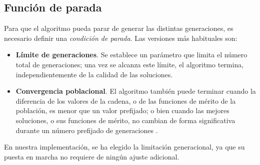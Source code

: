 \documentclass[12pt,a4paper]{book}
\begin{document}
\subsection{Función de parada}
Para que el algoritmo pueda parar de generar las distintas generaciones, es necesario definir una \textsl{condición de parada}. Las versiones más habituales son: 

\begin{itemize}
	\item \textbf{Límite de generaciones}. Se establece un parámetro que limita el número total de generaciones; una vez se alcanza este límite, el algoritmo termina, independientemente de la calidad de las soluciones. 
	\item \textbf{Convergencia poblacional}. El algoritmo también puede terminar cuando la diferencia de los valores de la cadena, o de las funciones de mérito de la población, es menor que un valor prefijado; o bien cuando las mejores soluciones, o sus funciones de mérito, no cambian de forma significativa durante un número prefijado de generaciones \cite{e_besada_optimizacion_nodate}. 
\end{itemize}

En nuestra implementación, se ha elegido la limitación generacional, ya que su puesta en marcha no requiere de ningún ajuste adicional. 
\end{document}

